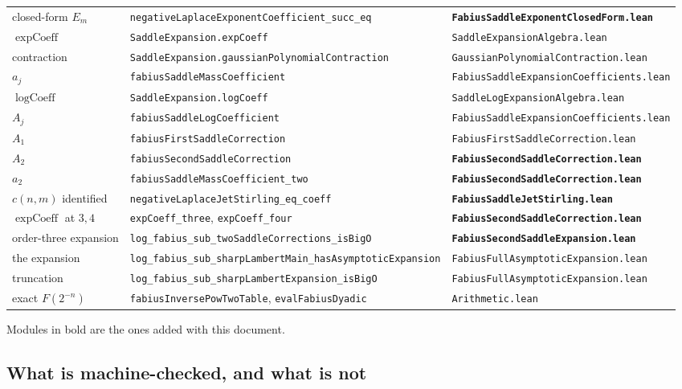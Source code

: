 \documentclass[11pt,oneside]{article}
\theoremstyle{definition}
\theoremstyle{remark}
\begin{document}
\begin{center}
\begin{longtable}{@{}lll@{}}
closed-form $E_m$ & \texttt{negativeLaplaceExponentCoefficient\_succ\_eq} & \textbf{\texttt{FabiusSaddleExponentClosedForm.lean}}\\
$\operatorname{expCoeff}$ & \texttt{SaddleExpansion.expCoeff} & \texttt{SaddleExpansionAlgebra.lean}\\
contraction & \texttt{SaddleExpansion.gaussianPolynomialContraction} & \texttt{GaussianPolynomialContraction.lean}\\
$a_j$ & \texttt{fabiusSaddleMassCoefficient} & \texttt{FabiusSaddleExpansionCoefficients.lean}\\
$\operatorname{logCoeff}$ & \texttt{SaddleExpansion.logCoeff} & \texttt{SaddleLogExpansionAlgebra.lean}\\
$A_j$ & \texttt{fabiusSaddleLogCoefficient} & \texttt{FabiusSaddleExpansionCoefficients.lean}\\
$A_1$ & \texttt{fabiusFirstSaddleCorrection} & \texttt{FabiusFirstSaddleCorrection.lean}\\
$A_2$ & \texttt{fabiusSecondSaddleCorrection} & \textbf{\texttt{FabiusSecondSaddleCorrection.lean}}\\
$a_2$ & \texttt{fabiusSaddleMassCoefficient\_two} & \textbf{\texttt{FabiusSecondSaddleCorrection.lean}}\\
$c(n,m)$ identified & \texttt{negativeLaplaceJetStirling\_eq\_coeff} & \textbf{\texttt{FabiusSaddleJetStirling.lean}}\\
$\operatorname{expCoeff}$ at $3,4$ & \texttt{expCoeff\_three}, \texttt{expCoeff\_four} & \textbf{\texttt{FabiusSecondSaddleCorrection.lean}}\\
order-three expansion & \texttt{log\_fabius\_sub\_twoSaddleCorrections\_isBigO} & \textbf{\texttt{FabiusSecondSaddleExpansion.lean}}\\
the expansion & \texttt{log\_fabius\_sub\_sharpLambertMain\_hasAsymptoticExpansion} & \texttt{FabiusFullAsymptoticExpansion.lean}\\
truncation & \texttt{log\_fabius\_sub\_sharpLambertExpansion\_isBigO} & \texttt{FabiusFullAsymptoticExpansion.lean}\\
exact $F(2^{-n})$ & \texttt{fabiusInversePowTwoTable}, \texttt{evalFabiusDyadic} & \texttt{Arithmetic.lean}\\
\bottomrule
\end{longtable}
\end{center}

Modules in bold are the ones added with this document.

\subsection{What is machine-checked, and what is not}
\end{document}
